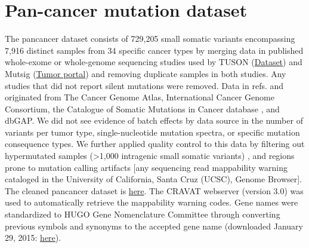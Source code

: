 \begingroup             
\let\clearpage\relax

\chapter{Pan-cancer mutation dataset}
\label{app:pancan_mutations}

The pancancer dataset consists of 729,205 small somatic variants encompassing 7,916 distinct samples from 34 specific cancer types by merging data in published whole-exome or whole-genome sequencing studies used by TUSON (\href{www.elledgelab.med.harvard.edu/wp-content/uploads/2013/11/Mutation_Dataset.txt.zip}{Dataset}) \cite{RN71} and Mutsig (\href{www.tumorportal.org/load/data/per_ttype_mafs/PanCan.maf}{Tumor portal}) \cite{RN14} and removing duplicate samples in both studies. Any studies that did not report silent mutations were removed. Data in refs. \cite{RN71} and \cite{RN14} originated from The Cancer Genome Atlas, International Cancer Genome Consortium, the Catalogue of Somatic Mutations in Cancer database \cite{RN97}, and dbGAP. We did not see evidence of batch effects by data source in the number of variants per tumor type, single-nucleotide mutation spectra, or specific mutation consequence types. We further applied quality control to this data by filtering out hypermutated samples (>1,000 intragenic small somatic variants) \cite{RN25}, and regions prone to mutation calling artifacts [any sequencing read mappability warning cataloged in the University of California, Santa Cruz (UCSC), Genome Browser]. The cleaned pancancer dataset is \href{http://karchinlab.org/data/Protocol/pancan-mutation-set-from-Tokheim-2016.txt.gz}{here}. The CRAVAT webserver (version 3.0) was used to automatically retrieve the mappability warning codes. Gene names were standardized to HUGO Gene Nomenclature Committee through converting previous symbols and synonyms to the accepted gene name (downloaded January 29, 2015: \href{ftp://ftp.ebi.ac.uk/pub/databases/genenames/locus_groups/protein-coding_gene.txt.gz}{here}). 

\endgroup